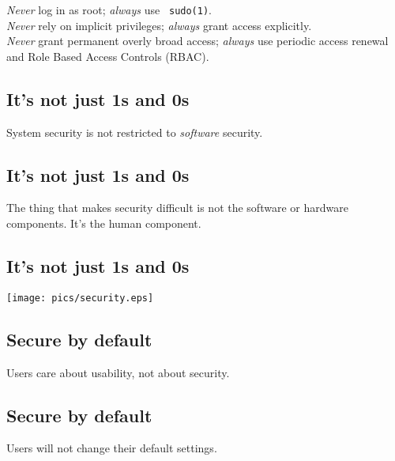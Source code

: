 \documentclass[xga]{xdvislides}
\begin{document}
{\em Never} log in as root; {\em always} use {\tt
sudo(1)}. \\

{\em Never} rely on implicit privileges; {\em always}
grant access explicitly. \\

{\em Never} grant permanent overly broad access; {\em
always} use periodic access renewal and Role Based
Access Controls (RBAC).

\subsection{It's not just 1s and 0s}
\vspace{.5in}
\Huge
\begin{center}
System security is not restricted to {\em software} security.
\end{center}
\Normalsize

\subsection{It's not just 1s and 0s}
\vspace{.5in}
\Huge
\begin{center}
The thing that makes security difficult is not the software or hardware
components.  It's the human component.
\end{center}
\Normalsize

\subsection{It's not just 1s and 0s}
\vspace*{\fill}
\begin{center}
	\texttt{[image: pics/security.eps]}
\end{center}
\vspace*{\fill}

\subsection{Secure by default}
\vspace{.5in}
\Huge
\begin{center}
Users care about usability, not about security. \\
\end{center}
\vspace*{\fill}
\Normalsize

\subsection{Secure by default}
\vspace{.5in}
\Huge
\begin{center}
Users will not change their default settings.
\end{center}
\Normalsize
\end{document}
